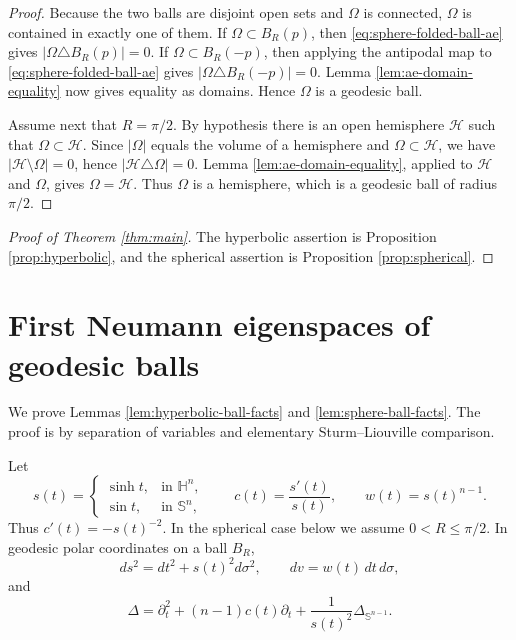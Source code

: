 \documentclass[11pt]{amsart}
\theoremstyle{remark}
\newcommand{\HH}{\mathbb H}
\newcommand{\Sn}{\mathbb S}
\begin{document}
\begin{proof}
Because the two balls are disjoint open sets and $\Omega$ is connected, $\Omega$ is contained in exactly one of them.  If $\Omega\subset B_R(p)$, then \eqref{eq:sphere-folded-ball-ae} gives $|\Omega\triangle B_R(p)|=0$.  If $\Omega\subset B_R(-p)$, then applying the antipodal map to \eqref{eq:sphere-folded-ball-ae} gives $|\Omega\triangle B_R(-p)|=0$.  Lemma \ref{lem:ae-domain-equality} now gives equality as domains.  Hence $\Omega$ is a geodesic ball.

Assume next that $R=\pi/2$.  By hypothesis there is an open hemisphere $\mathcal H$ such that $\Omega\subset\mathcal H$.  Since $|\Omega|$ equals the volume of a hemisphere and $\Omega\subset\mathcal H$, we have $|\mathcal H\setminus\Omega|=0$, hence $|\mathcal H\triangle\Omega|=0$.  Lemma \ref{lem:ae-domain-equality}, applied to $\mathcal H$ and $\Omega$, gives $\Omega=\mathcal H$.  Thus $\Omega$ is a hemisphere, which is a geodesic ball of radius $\pi/2$.
\end{proof}

\begin{proof}[Proof of Theorem \ref{thm:main}]
The hyperbolic assertion is Proposition \ref{prop:hyperbolic}, and the spherical assertion is Proposition \ref{prop:spherical}.
\end{proof}

\appendix

\section{First Neumann eigenspaces of geodesic balls}
\label{app:first-neumann-balls}

We prove Lemmas \ref{lem:hyperbolic-ball-facts} and
\ref{lem:sphere-ball-facts}.  The proof is by separation of variables and
elementary Sturm--Liouville comparison.

Let
$$
        s(t)=
        \begin{cases}
        \sinh t, & \text{in } \HH^n,\\
        \sin t,  & \text{in } \Sn^n,
        \end{cases}
        \qquad
        c(t)=\frac{s'(t)}{s(t)},
        \qquad
        w(t)=s(t)^{n-1}.
$$
Thus \(c'(t)=-s(t)^{-2}\).  In the spherical case below we assume
\(0<R\le \pi/2\).  In geodesic polar coordinates on a ball \(B_R\),
$$
        ds^2=dt^2+s(t)^2d\sigma^2,
        \qquad
        dv=w(t)\,dt\,d\sigma,
$$
and
$$
        \Delta
        =
        \partial_t^2+(n-1)c(t)\partial_t
        +\frac1{s(t)^2}\Delta_{\Sn^{n-1}}.
$$
\end{document}
